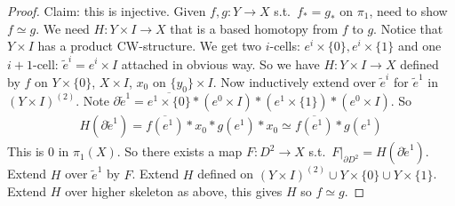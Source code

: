 \documentclass[12pt,class=article,crop=false]{standalone}
\begin{document}
\begin{proof}
	Claim: this is injective. Given  $ f,g: Y \to X$ s.t.\ $ f_*=g_*$ on  $ \pi_1$, need to show $ f \simeq g$. We need $ H: Y \times I \to X$ that is a based homotopy from $ f$ to  $ g$. Notice that $ Y \times I$ has a product CW-structure. We get two $ i$-cells:  $ e^{i} \times \{0\}, e^{i} \times \{1\}  $ and one $ i+1$-cell:  $ \widetilde{ e}^{i} = e^{i} \times I$ attached in obvious way. So we have $ H:Y \times I \to X$ defined by $ f$ on  $ Y \times \{0\} $, $ X \times I$, $ x_0$ on $ \{y_0\} \times I $. Now inductively extend over $ \widetilde{ e}^{i}$ for $ \widetilde{ e}^{1}$ in $ (Y \times I)^{(2)}$. Note $ \partial \widetilde{ e}^{1} = \overline{ e^{1} \times \{0\}} * ( e^{0} \times I) * (e^{1} \times \{1\} )* (e^{0} \times I)$. So
	\begin{align*}
		H(\partial \widetilde{ e}^{1}) = \overline{f(e^{1})} * x_0 * g(e^{1}) * x_0 \simeq \overline{f(e^{1})} * g(e^{1})
	\end{align*}
	This is 0 in $ \pi_1(X)$. So there exists a map $ F: D^2 \to X$ s.t.\ $ F|_{\partial  D^2 } = H(\partial \widetilde{ e}^{1})$. Extend $ H$ over  $ \widetilde{ e}^{1}$ by $ F$. Extend  $ H$ defined on  $ (Y \times I)^{(2)} \cup Y \times  \{0\} \cup Y \times \{1\} $. Extend $ H$ over higher skeleton as above, this gives  $ H$ so  $ f \simeq g$.
\end{proof}
\end{document}
